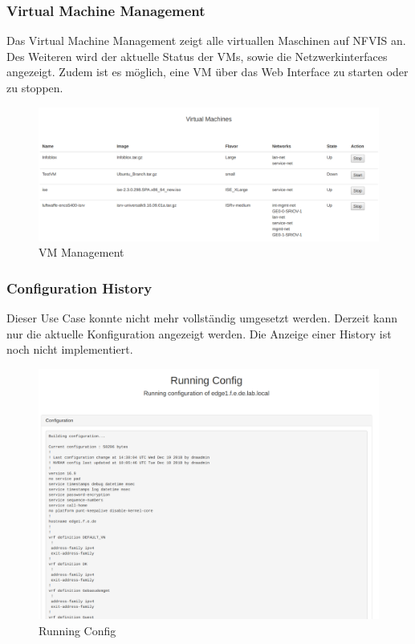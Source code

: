 \subsubsection{Virtual Machine Management}

Das Virtual Machine Management zeigt alle virtuallen Maschinen auf NFVIS an. Des Weiteren wird der aktuelle Status der VMs, sowie die Netzwerkinterfaces angezeigt. Zudem ist es möglich, eine VM über das Web Interface zu starten oder zu stoppen.

\begin{figure}[H]
	\centering
	\includegraphics[width=0.8\linewidth]{img/Abstrahierung/vm-management.png}
	\caption{VM Management}
	\label{fig:VM Management}
\end{figure}

\subsubsection{Configuration History}

Dieser Use Case konnte nicht mehr vollständig umgesetzt werden. Derzeit kann nur die aktuelle Konfiguration angezeigt werden. Die Anzeige einer History ist noch nicht implementiert.

\begin{figure}[H]
	\centering
	\includegraphics[width=0.8\linewidth]{img/Abstrahierung/running-config.png}
	\caption{Running Config}
	\label{fig:Running Config}
\end{figure}






